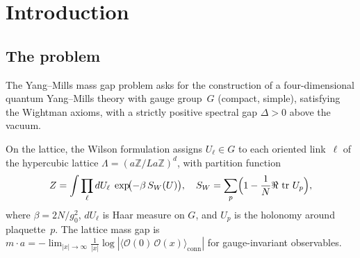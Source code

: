 \documentclass[11pt,a4paper]{article}
\theoremstyle{plain}
\theoremstyle{definition}
\theoremstyle{remark}
\newcommand{\Z}{\mathbb{Z}}
\newcommand{\tr}{\operatorname{tr}}
\newcommand{\SU}{\mathrm{SU}}
\begin{document}
\begin{abstract}
\textbf{Result~4} (Triviality obstruction).  Any
$\beta$-independent lower bound $m \cdot a \geq c_0 > 0$
(including that from Result~3) implies a trivial
continuum limit.  A non-trivial theory requires the
$\beta$-dependent bound of Result~1.

\textbf{Result~5} (Continuum limit and Wightman axioms).
Using~(B1)--(B4) and the mass gap (Result~1),
three technical inputs---$O(a^2)$
lattice corrections, reflection positivity of the continuum
limit, and transfer of polymer bounds to Schwinger
functions---are resolved within this paper via Reisz's
power-counting theorem, dominated convergence from the
lattice Wilson action, and Dobrushin analyticity at the
Dobrushin scale.  The result: the renormalized Schwinger
functions converge as $a \to 0$ to a unique relativistic
QFT satisfying the Wightman axioms with mass gap
$\Delta > 0$, and the theory is interacting
($\lambda_4 \neq 0$).
For $G = \SU(2)$, $d = 4$, this is unconditional
(via~\cite{FontesSU2}).
\end{abstract}

\tableofcontents

\section{Introduction}\label{sec:intro}

\subsection{The problem}

The Yang--Mills mass gap problem asks for the construction
of a four-dimensional quantum Yang--Mills theory with gauge
group~$G$ (compact, simple), satisfying the Wightman axioms,
with a strictly positive spectral gap $\Delta > 0$ above
the vacuum.

On the lattice, the Wilson formulation assigns $U_\ell \in G$
to each oriented link~$\ell$ of the hypercubic lattice
$\Lambda = (a\Z / La\Z)^d$, with partition function
\begin{equation}\label{eq:partition}
  Z = \int \prod_\ell dU_\ell \; \exp\!\bigl(-\beta\,S_W(U)\bigr),
  \quad S_W = \sum_p \Bigl(1 - \frac{1}{N}\Re\,\tr\,U_p\Bigr),
\end{equation}
where $\beta = 2N/g_0^2$, $dU_\ell$ is Haar measure on $G$,
and $U_p$ is the holonomy around plaquette~$p$.  The lattice
mass gap is $m \cdot a = -\lim_{|x| \to \infty}
\frac{1}{|x|}\log|\langle \mathcal{O}(0)\,\mathcal{O}(x)
\rangle_{\mathrm{conn}}|$ for gauge-invariant observables.
\end{document}
